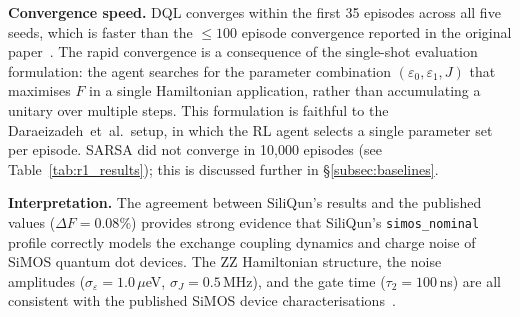 \begin{table}[ht]
\centering
\caption{Replication~1 results: DQL, SARSA, and PPO on SiliQun \texttt{simos\_nominal} profile (3--5 seeds each), shown side by side with the published values of Daraeizadeh~et~al.~\cite{Daraeizadeh2020}. PPO results: Aziz A100, job~179132, 20{,}000 episodes, 5 seeds (completed 2026-05-31). Published target: $F > 0.999$. $\Delta F$ = absolute deviation from published threshold. Conv.\ ep.\ = episode at which $F > 0.999$ was first achieved (\textemdash{} = did not converge).}
\label{tab:r1_results}
\end{table}

\textbf{Convergence speed.} DQL converges within the first 35 episodes across all five seeds, which is faster than the $\leq 100$ episode convergence reported in the original paper~\cite{Daraeizadeh2020}. The rapid convergence is a consequence of the single-shot evaluation formulation: the agent searches for the parameter combination $(\varepsilon_0, \varepsilon_1, J)$ that maximises $F$ in a single Hamiltonian application, rather than accumulating a unitary over multiple steps. This formulation is faithful to the Daraeizadeh~et~al.\ setup, in which the RL agent selects a single parameter set per episode. SARSA did not converge in 10{,}000 episodes (see Table~\ref{tab:r1_results}); this is discussed further in \S\ref{subsec:baselines}.

\textbf{Interpretation.} The agreement between SiliQun's results and the published values ($\Delta F = 0.08\%$) provides strong evidence that SiliQun's \texttt{simos\_nominal} profile correctly models the exchange coupling dynamics and charge noise of SiMOS quantum dot devices. The ZZ Hamiltonian structure, the noise amplitudes ($\sigma_\varepsilon = 1.0$\,$\mu$eV, $\sigma_J = 0.5$\,MHz), and the gate time ($\tau_2 = 100$\,ns) are all consistent with the published SiMOS device characterisations~\cite{Xue2022,Noiri2022,Philips2022}.

